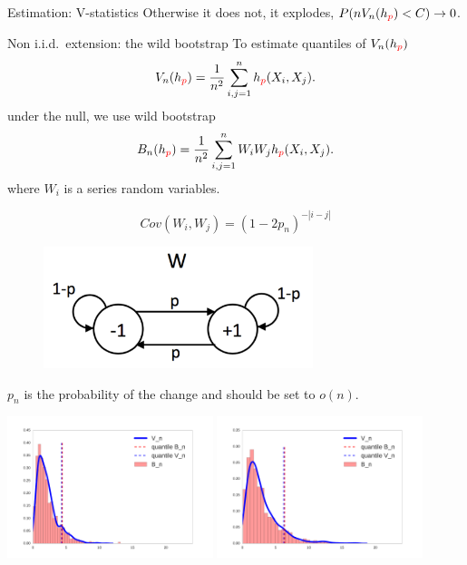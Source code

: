 \begin{frame}
\begin{columns}
\begin{column}{.33\linewidth}
\begin{block}{Estimation: V-statistics}
Otherwise it does not,  it explodes, $P(n V_n(h_{\color{red} p}) <C) \to 0$.
\end{block}
\vspace{-0.75cm}
\begin{block}{Non i.i.d.\ extension: the wild bootstrap}
To estimate quantiles of $ V_n(h_{\color{red} p})$  
\[
 V_n(h_{\color{red} p}) = \frac {1} {n^2} \sum_{i,j=1}^n h_{\color{red} p}(X_i,X_j).
\]
under the null, we use wild bootstrap
\[
 B_n(h_{\color{red} p}) = \frac {1} {n^2} \sum_{i,j=1}^n W_i W_j h_{\color{red} p}(X_i,X_j).
\]
  where $W_i$ is a  series  random variables.
\begin{center}
  \begin{minipage}{.49\linewidth}
       $$
  Cov(W_i,W_j) = (1-2p_n)^{-|i-j|}
  $$
\end{minipage}
\begin{minipage}{.49\linewidth}
 \begin{figure}
            \vspace{-0.5cm}
           \includegraphics[width=0.7\textwidth, angle =0 ]{../../presentation/img/W_graphicalModel.pdf} 
        \end{figure}
\end{minipage}
\end{center}
  $p_n$ is  the probability of the change  and should be set to $o(n)$.





 \includegraphics[width=0.45\textwidth]{../../presentation/img/bootstrapWorks1.pdf}
 \includegraphics[width=0.45\textwidth]{../../presentation/img/bootstrapWorks4.pdf}


\end{block}
\end{column}
\end{columns}
\end{frame}

